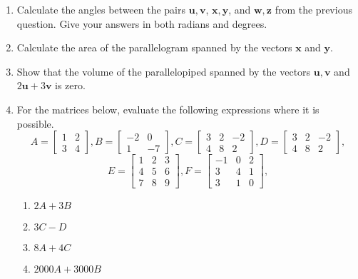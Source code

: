 \documentclass[11pt,a4paper,titlepage,oneside,openany]{article}
\numberwithin{equation}{section}
\numberwithin{algorithm}{section}
\numberwithin{figure}{section}
\numberwithin{table}{section}
\renewcommand{\vec}[1]{\mathbf{#1}}
\begin{document}
\begin{enumerate}
\item
  Calculate the angles between the pairs $\vec{u},\vec{v}$, $\vec{x},\vec{y}$, and $\vec{w},\vec{z}$ from the previous question. Give your answers in both radians and degrees.

\item
  Calculate the area of the parallelogram spanned by the vectors $\vec{x}$ and $\vec{y}$.
\item
  Show that the volume of the parallelopiped spanned by the vectors $\vec{u},\vec{v}$ and $2\vec{u}+3\vec{v}$ is zero.

\item
  For the matrices below, evaluate the following expressions where it is possible.
  \begin{equation*}
    A=\left[ \begin{array}{cc} 1  & 2 \\ 3 & 4 \end{array}\right],
    B=\left[ \begin{array}{cc} -2  & 0 \\ 1 & -7 \end{array}\right],
    C=\left[ \begin{array}{ccc} 3  & 2 & -2 \\ 4 & 8 & 2 \end{array}\right],
    D=\left[ \begin{array}{ccc} 3  & 2 & -2 \\ 4 & 8 & 2 \end{array}\right],
  \end{equation*}
  \begin{equation*}
    E=\left[ \begin{array}{ccc} 1  & 2 & 3 \\ 4 & 5 & 6 \\ 7 & 8 & 9 \end{array}\right],
    F=\left[ \begin{array}{ccc} -1  & 0 & 2 \\ 3 & 4 & 1 \\  3 & 1 & 0 \end{array}\right],     
  \end{equation*}
  \begin{multicols}{3}
    \begin{enumerate}
    \item $2A+3B$
    \item $3C-D$
    \item $8A+4C$
    \item $2000A+3000B$

\end{enumerate}
\end{multicols}
\end{enumerate}
\end{document}
